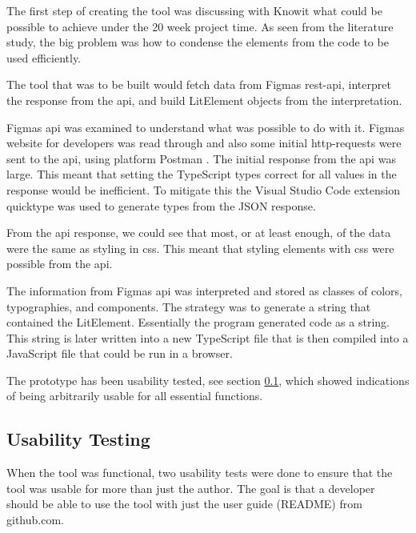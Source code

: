 The first step of creating the tool was discussing with Knowit what could be possible to achieve under the 20 week project time. As seen from the literature study, the big problem was how to condense the elements from the code to be used efficiently. 

The tool that was to be built would fetch data from Figmas \acrshort{rest}-\acrshort{api}, interpret the response from the \acrshort{api}, and build LitElement objects from the interpretation.

Figmas \acrshort{api} was examined to understand what was possible to do with it. Figmas website for developers \cite{figmaFigma} was read through and also some initial \acrshort{http}-requests were sent to the \acrshort{api}, using platform Postman \cite{PostmanCollaborationPlatform}. The initial response from the \acrshort{api} was large. This meant that setting the TypeScript types correct for all values in the response would be inefficient. To mitigate this the Visual Studio Code \cite{VisualStudioCode} extension quicktype \cite{ConvertJSONSwift} was used to generate types from the JSON response. 

From the \acrshort{api} response, we could see that most, or at least enough, of the data were the same as styling in \acrshort{css}. This meant that styling elements with \acrshort{css} were possible from the \acrshort{api}.

The information from Figmas \acrshort{api} was interpreted and stored as classes of colors, typographies, and \glspl{component}. The strategy was to generate a string that contained the LitElement. Essentially the program generated code as a string. This string is later written into a new TypeScript file that is then compiled into a JavaScript file that could be run in a browser.


The prototype has been usability tested, see section \ref{sub:Usability Testing}, which showed indications of being arbitrarily usable for all essential functions. 

\subsection{Usability Testing}%
\label{sub:Usability Testing}
When the tool was functional, two usability tests were done to ensure that the tool was usable for more than just the author. The goal is that a developer should be able to use the tool with just the user guide (README) from github.com. 

